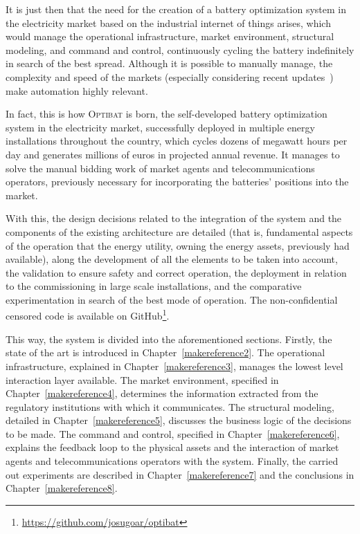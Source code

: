 It is just then that the need for the creation of a battery optimization system in the electricity market based on the industrial internet of things arises, which would manage the operational infrastructure, market environment, structural modeling, and command and control, continuously cycling the battery indefinitely in search of the best spread. Although it is possible to manually manage, the complexity and speed of the markets (especially considering recent updates~\cite{cnmc2025resolucion, omie2025instruccion}) make automation highly relevant.

In fact, this is how \textsc{Optibat} is born, the self-developed battery optimization system in the electricity market, successfully deployed in multiple energy installations throughout the country, which cycles dozens of megawatt hours per day and generates millions of euros in projected annual revenue. It manages to solve the manual bidding work of market agents and telecommunications operators, previously necessary for incorporating the batteries' positions into the market.

With this, the design decisions related to the integration of the system and the components of the existing architecture are detailed (that is, fundamental aspects of the operation that the energy utility, owning the energy assets, previously had available), along the development of all the elements to be taken into account, the validation to ensure safety and correct operation, the deployment in relation to the commissioning in large scale installations, and the comparative experimentation in search of the best mode of operation. The non-confidential censored code is available on GitHub\footnote{\url{https://github.com/josugoar/optibat}}.

This way, the system is divided into the aforementioned sections. Firstly, the state of the art is introduced in Chapter~\ref{makereference2}. The operational infrastructure, explained in Chapter~\ref{makereference3}, manages the lowest level interaction layer available. The market environment, specified in Chapter~\ref{makereference4}, determines the information extracted from the regulatory institutions with which it communicates. The structural modeling, detailed in Chapter~\ref{makereference5}, discusses the business logic of the decisions to be made. The command and control, specified in Chapter~\ref{makereference6}, explains the feedback loop to the physical assets and the interaction of market agents and telecommunications operators with the system. Finally, the carried out experiments are described in Chapter~\ref{makereference7} and the conclusions in Chapter~\ref{makereference8}.

